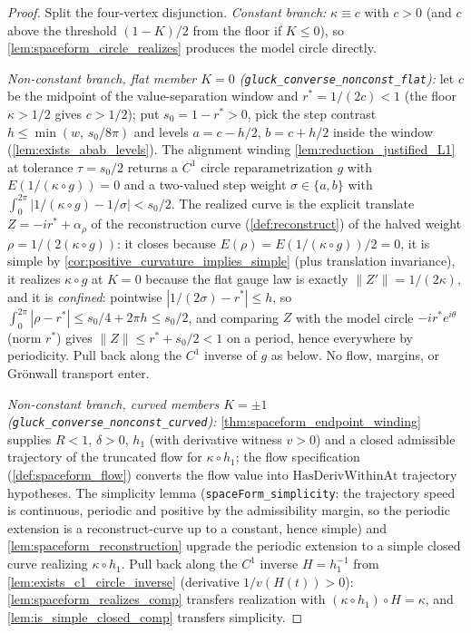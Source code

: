 \begin{proof}
  \leanok
  Split the four-vertex disjunction. \emph{Constant branch:} $\kappa\equiv c$
  with $c>0$ (and $c$ above the threshold $(1-K)/2$ from the floor if
  $K\le0$), so
  \cref{lem:spaceform_circle_realizes} produces the model circle directly.

  \emph{Non-constant branch, flat member $K=0$
  (\texttt{gluck\_converse\_nonconst\_flat}):} let $c$ be the
  midpoint of the value-separation window and $r^\ast=1/(2c)<1$ (the floor
  $\kappa>1/2$ gives $c>1/2$); put $s_0=1-r^\ast>0$, pick the step contrast
  $h\le\min(w,\,s_0/8\pi)$ and levels $a=c-h/2$, $b=c+h/2$ inside the
  window (\cref{lem:exists_abab_levels}). The alignment winding
  \cref{lem:reduction_justified_L1} at tolerance $\tau=s_0/2$ returns a $C^1$
  circle reparametrization $g$ with $E(1/(\kappa\circ g))=0$ and a
  two-valued step weight $\sigma\in\{a,b\}$ with
  $\int_0^{2\pi}|1/(\kappa\circ g)-1/\sigma|<s_0/2$. The realized curve is
  the explicit translate $Z=-ir^\ast+\alpha_{\rho}$ of the reconstruction
  curve (\cref{def:reconstruct}) of the halved weight
  $\rho=1/(2(\kappa\circ g))$: it closes because $E(\rho)=E(1/(\kappa\circ
  g))/2=0$, it is simple by \cref{cor:positive_curvature_implies_simple}
  (plus translation invariance), it realizes $\kappa\circ g$ at
  $K=0$ because the flat gauge law is exactly
  $\|Z'\|=1/(2\kappa)$, and it is \emph{confined}: pointwise
  $|1/(2\sigma)-r^\ast|\le h$, so
  $\int_0^{2\pi}|\rho-r^\ast|\le s_0/4+2\pi h\le s_0/2$, and comparing
  $Z$ with the model circle $-ir^\ast e^{i\theta}$ (norm $r^\ast$) gives
  $\|Z\|\le r^\ast+s_0/2<1$ on a period, hence everywhere by periodicity.
  Pull back along the $C^1$ inverse of $g$ as below. No flow, margins, or
  Gr\"onwall transport enter.

  \emph{Non-constant branch, curved members $K=\pm1$
  (\texttt{gluck\_converse\_nonconst\_curved}):}
  \cref{thm:spaceform_endpoint_winding} supplies
  $R<1$, $\delta>0$, $h_1$ (with derivative witness $v>0$) and a closed
  admissible trajectory of the truncated flow for $\kappa\circ h_1$; the flow
  specification (\cref{def:spaceform_flow}) converts the flow value into
  $\mathrm{HasDerivWithinAt}$ trajectory hypotheses. The simplicity lemma
  (\texttt{spaceForm\_simplicity}: the trajectory speed is continuous, periodic
  and positive by the admissibility margin, so the periodic extension is a
  reconstruct-curve up to a constant, hence simple) and
  \cref{lem:spaceform_reconstruction} upgrade the periodic extension to a simple
  closed curve realizing $\kappa\circ h_1$. Pull back along the $C^1$ inverse
  $H=h_1^{-1}$ from \cref{lem:exists_c1_circle_inverse} (derivative
  $1/v(H(t))>0$): \cref{lem:spaceform_realizes_comp} transfers realization with
  $(\kappa\circ h_1)\circ H=\kappa$, and \cref{lem:is_simple_closed_comp}
  transfers simplicity.
\end{proof}

